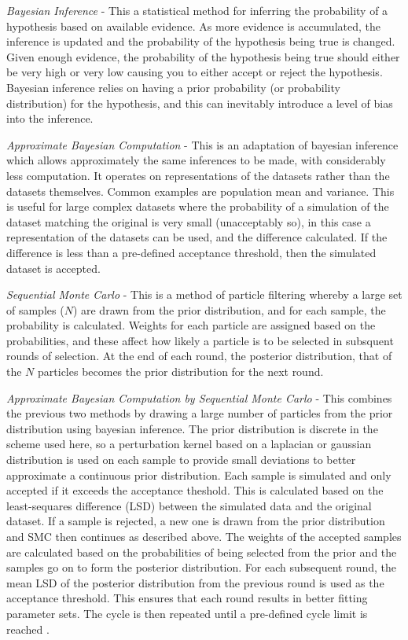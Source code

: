 \textit{Bayesian Inference} - This a statistical method for inferring the probability of a hypothesis based on available evidence. As more evidence is accumulated, the inference is updated and the probability of the hypothesis being true is changed. Given enough evidence, the probability of the hypothesis being true should either be very high or very low causing you to either accept or reject the hypothesis. Bayesian inference relies on having a prior probability (or probability distribution) for the hypothesis, and this can inevitably introduce a level of bias into the inference.

\textit{Approximate Bayesian Computation} - This is an adaptation of bayesian inference which allows approximately the same inferences to be made, with considerably less computation. It operates on representations of the datasets rather than the datasets themselves. Common examples are population mean and variance. This is useful for large complex datasets where the probability of a simulation of the dataset matching the original is very small (unacceptably so), in this case a representation of the datasets can be used, and the difference calculated. If the difference is less than a pre-defined acceptance threshold, then the simulated dataset is accepted.

\textit{Sequential Monte Carlo} - This is a method of particle filtering whereby a large set of samples ($N$) are drawn from the prior distribution, and for each sample, the probability is calculated. Weights for each particle are assigned based on the probabilities, and these affect how likely a particle is to be selected in subsquent rounds of selection. At the end of each round, the posterior distribution, that of the $N$ particles becomes the prior distribution for the next round.

\textit{Approximate Bayesian Computation by Sequential Monte Carlo} - This combines the previous two methods by drawing a large number of particles from the prior distribution using bayesian inference. The prior distribution is discrete in the scheme used here, so a perturbation kernel based on a laplacian or gaussian distribution is used on each sample to provide small deviations to better approximate a continuous prior distribution. Each sample is simulated and only accepted if it exceeds the acceptance theshold. This is calculated based on the least-sequares difference (LSD) between the simulated data and the original dataset. If a sample is rejected, a new one is drawn from the prior distribution and SMC then continues as described above. The weights of the accepted samples are calculated based on the probabilities of being selected from the prior and the samples go on to form the posterior distribution. For each subsequent round, the mean LSD of the posterior distribution from the previous round is used as the acceptance threshold. This ensures that each round results in better fitting parameter sets. The cycle is then repeated until a pre-defined cycle limit is reached \cite{Toni2009}.

